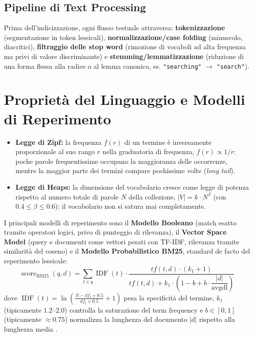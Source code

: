 \subsection{Pipeline di Text Processing}
Prima dell'indicizzazione, ogni flusso testuale attraversa: \textbf{tokenizzazione} (segmentazione in token lessicali), \textbf{normalizzazione/case folding} (minuscolo, diacritici), \textbf{filtraggio delle stop word} (rimozione di vocaboli ad alta frequenza ma privi di valore discriminante) e \textbf{stemming/lemmatizzazione} (riduzione di una forma flessa alla radice o al lemma canonico, es. \texttt{"searching"} $\to$ \texttt{"search"}).

\FloatBarrier
\section{Propriet\`a del Linguaggio e Modelli di Reperimento}
\label{sec:proprieta-linguaggio-modelli}

\begin{itemize}
    \item \textbf{Legge di Zipf:} la frequenza $f(r)$ di un termine \`e inversamente proporzionale al suo rango $r$ nella graduatoria di frequenza, $f(r) \propto 1/r$: poche parole frequentissime occupano la maggioranza delle occorrenze, mentre la maggior parte dei termini compare pochissime volte (\textit{long tail}).
    \item \textbf{Legge di Heaps:} la dimensione del vocabolario cresce come legge di potenza rispetto al numero totale di parole $N$ della collezione, $|V| = k \cdot N^\beta$ (con $0.4 \le \beta \le 0.6$): il vocabolario non si satura mai completamente.
\end{itemize}

I principali modelli di reperimento sono il \textbf{Modello Booleano} (match esatto tramite operatori logici, privo di punteggio di rilevanza), il \textbf{Vector Space Model} (query e documenti come vettori pesati con TF-IDF, rilevanza tramite similarit\`a del coseno) e il \textbf{Modello Probabilistico BM25}, standard de facto del reperimento lessicale:
\begin{equation}
\operatorname{score}_{\text{BM25}}(q, d) = \sum_{t \in q} \operatorname{IDF}(t) \cdot \frac{tf(t, d) \cdot (k_1 + 1)}{tf(t, d) + k_1 \cdot \left(1 - b + b \cdot \dfrac{|d|}{\text{avgdl}}\right)}
\label{eq:bm25-formula}
\end{equation}
dove $\operatorname{IDF}(t) = \ln\!\left(\frac{N - df_t + 0.5}{df_t + 0.5} + 1\right)$ pesa la specificit\`a del termine, $k_1$ (tipicamente $1.2$--$2.0$) controlla la saturazione del term frequency e $b \in [0,1]$ (tipicamente $\approx 0.75$) normalizza la lunghezza del documento $|d|$ rispetto alla lunghezza media .

